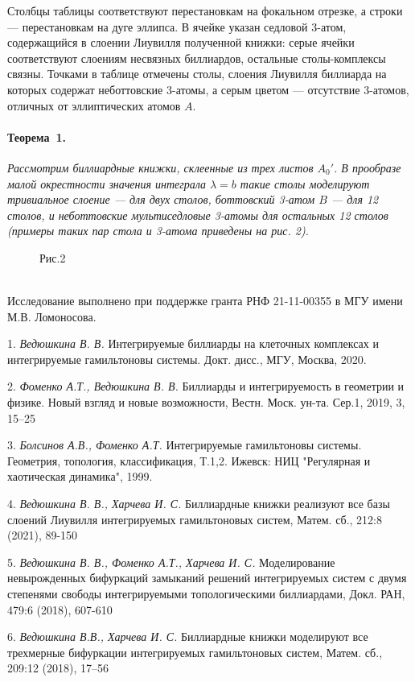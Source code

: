 Столбцы таблицы соответствуют перестановкам на фокальном отрезке, а строки --- перестановкам на дуге эллипса. В ячейке указан седловой 3-атом, содержащийся в слоении Лиувилля полученной книжки: серые ячейки соответствуют слоениям несвязных биллиардов, остальные столы-комплексы связны. Точками в таблице отмечены столы, слоения Лиувилля биллиарда на которых содержат неботтовские 3-атомы, а серым цветом --- отсутствие 3-атомов, отличных от эллиптических атомов $A$.\\

 \vspace*{-0.6cm} 
\paragraph{Теорема~1.}
{\it
	Рассмотрим биллиардные книжки, склеенные из трех листов $A_0'$. В прообразе малой окрестности значения интеграла $\lambda=b$ такие столы моделируют тривиальное слоение — для двух столов, боттовский 3-атом $B$ — для 12 столов, и неботтовские мультиседловые 3-атомы для остальных 12 столов (примеры таких пар стола и 3-атома приведены на рис. 2).
}
\vspace*{-0.5cm} 
\begin{figure}[h!]
\begin{minipage}[h!]{0.49\linewidth}
\end{minipage}
\begin{minipage}[h!]{0.49\linewidth}
\end{minipage}
\begin{center}
Рис.2
\end{center}
\end{figure}\\

\vspace*{-0.8cm} 
Исследование выполнено при поддержке гранта РНФ 21-11-00355 в МГУ имени М.В. Ломоносова.
 
\litlist


1. {\it Ведюшкина В. В.}
 Интегрируемые биллиарды на клеточных комплексах и интегрируемые гамильтоновы системы. Докт. дисс., МГУ, Москва, 2020.
 
2. {\it Фоменко А.Т., Ведюшкина В. В.}
 Биллиарды и интегрируемость в геометрии и физике. Новый взгляд и новые возможности, Вестн. Моск. ун-та. Сер.1, 2019, 3, 15–25
 
3.  {\it Болсинов А.В., Фоменко А.Т.}
 Интегрируемые гамильтоновы системы. Геометрия, топология, классификация, Т.1,2. Ижевск: НИЦ "Регулярная и хаотическая динамика", 1999.
 
4. {\it Ведюшкина В. В., Харчева И. С.}
 Биллиардные книжки реализуют все базы слоений Лиувилля интегрируемых гамильтоновых систем, Матем. сб., 212:8 (2021),  89-150
 
5. {\it Ведюшкина В. В., Фоменко А.Т., Харчева И. С.}
 Моделирование невырожденных бифуркаций замыканий решений интегрируемых систем с двумя степенями свободы интегрируемыми топологическими биллиардами, Докл. РАН, 479:6 (2018), 607-610
 
 6. {\it Ведюшкина В.В., Харчева И. С.}
 Биллиардные книжки моделируют все трехмерные бифуркации интегрируемых гамильтоновых систем, Матем. сб., 209:12 (2018), 17–56
